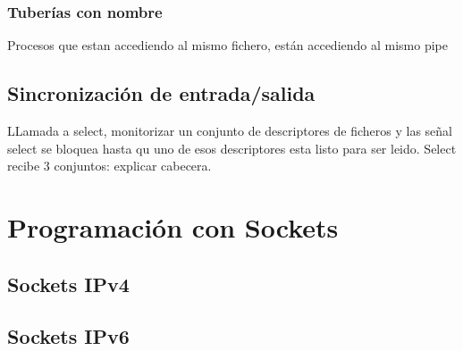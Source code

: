 \subsubsection{Tuberías con nombre}
Procesos que estan accediendo al mismo fichero, están accediendo al mismo pipe
\subsection{Sincronización de entrada/salida}
LLamada a select, monitorizar un conjunto de descriptores de ficheros y las señal select se bloquea hasta qu uno de esos descriptores esta listo para ser leido.
Select recibe 3 conjuntos: explicar cabecera.

\section{Programación con Sockets}
\subsection{Sockets IPv4}
\subsection{Sockets IPv6}
